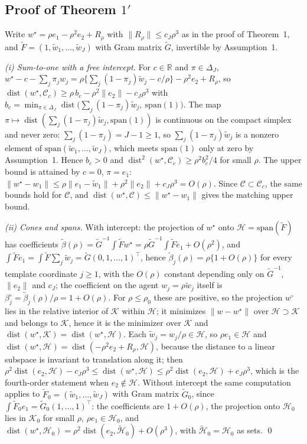 \documentclass[12pt]{article}
\newcommand{\R}{\mathbb{R}}
\newcommand{\calH}{\mathcal{H}}
\newcommand{\calC}{\mathcal{C}}
\newcommand{\calK}{\mathcal{K}}
\newcommand{\dist}{\operatorname{dist}}
\newcommand{\norm}[1]{\|#1\|}
\newcommand{\wstar}{w^{\star}}
\newcommand{\wproj}{w^{\circ}}
\begin{document}
\subsection*{Proof of Theorem $1'$}
Write $\wstar=\rho e_1-\rho^2e_2+R_\rho$ with $\norm{R_\rho}\le c_J\rho^3$ as in the proof of Theorem~1, and $\tilde F=(1,\tilde w_1,\dots,\tilde w_J)$ with Gram matrix $\tilde G$, invertible by Assumption~1.

\emph{(i) Sum-to-one with a free intercept.} For $c\in\R$ and $\pi\in\Delta_J$, $\wstar-c-\sum_j\pi_jw_j=\rho\{\sum_j(1-\pi_j)\tilde w_j-c/\rho\}-\rho^2e_2+R_\rho$, so $\dist(\wstar,\calC_c)\ge\rho\,b_c-\rho^2\norm{e_2}-c_J\rho^3$ with $b_c=\min_{\pi\in\Delta_J}\dist\big(\sum_j(1-\pi_j)\tilde w_j,\ \mathrm{span}(1)\big)$. The map $\pi\mapsto\dist(\sum_j(1-\pi_j)\tilde w_j,\mathrm{span}(1))$ is continuous on the compact simplex and never zero: $\sum_j(1-\pi_j)=J-1\ge1$, so $\sum_j(1-\pi_j)\tilde w_j$ is a nonzero element of $\mathrm{span}(\tilde w_1,\dots,\tilde w_J)$, which meets $\mathrm{span}(1)$ only at zero by Assumption~1. Hence $b_c>0$ and $\dist^2(\wstar,\calC_c)\ge\rho^2b_c^2/4$ for small $\rho$. The upper bound is attained by $c=0$, $\pi=e_1$: $\norm{\wstar-w_1}\le\rho\norm{e_1-\tilde w_1}+\rho^2\norm{e_2}+c_J\rho^3=O(\rho)$. Since $\calC\subset\calC_c$, the same bounds hold for $\calC$, and $\dist(\wstar,\calC)\le\norm{\wstar-w_1}$ gives the matching upper bound.

\emph{(ii) Cones and spans.} With intercept: the projection of $\wstar$ onto $\calH=\mathrm{span}(\tilde F)$ has coefficients $\tilde\beta(\rho)=\tilde G^{-1}\int\tilde F\wstar=\rho\tilde G^{-1}\int\tilde Fe_1+O(\rho^2)$, and $\int\tilde F e_1=\int\tilde F\sum_j\tilde w_j=\tilde G(0,1,\dots,1)^{\top}$, hence $\tilde\beta_j(\rho)=\rho\{1+O(\rho)\}$ for every template coordinate $j\ge1$, with the $O(\rho)$ constant depending only on $\tilde G^{-1}$, $\norm{e_2}$ and $c_J$; the coefficient on the agent $w_j=\rho\tilde w_j$ itself is $\beta^{\circ}_j=\tilde\beta_j(\rho)/\rho=1+O(\rho)$. For $\rho\le\rho_0$ these are positive, so the projection $\wproj$ lies in the relative interior of $\calK$ within $\calH$; it minimizes $\norm{w-\wstar}$ over $\calH\supset\calK$ and belongs to $\calK$, hence it is the minimizer over $\calK$ and $\dist(\wstar,\calK)=\dist(\wstar,\calH)$. Each $\tilde w_j=w_j/\rho\in\calH$, so $\rho e_1\in\calH$ and $\dist(\wstar,\calH)=\dist(-\rho^2e_2+R_\rho,\calH)$, because the distance to a linear subspace is invariant to translation along it; then $\rho^2\dist(e_2,\calH)-c_J\rho^3\le\dist(\wstar,\calH)\le\rho^2\dist(e_2,\calH)+c_J\rho^3$, which is the fourth-order statement when $e_2\notin\calH$. Without intercept the same computation applies to $\tilde F_0=(\tilde w_1,\dots,\tilde w_J)$ with Gram matrix $\tilde G_0$, since $\int\tilde F_0e_1=\tilde G_0(1,\dots,1)^{\top}$: the coefficients are $1+O(\rho)$, the projection onto $\calH_0$ lies in $\calK_0$ for small $\rho$, $\rho e_1\in\calH_0$, and $\dist(\wstar,\calH_0)=\rho^2\dist(e_2,\tilde{\calH}_0)+O(\rho^3)$, with $\tilde{\calH}_0=\calH_0$ as sets. \qed
\end{document}
